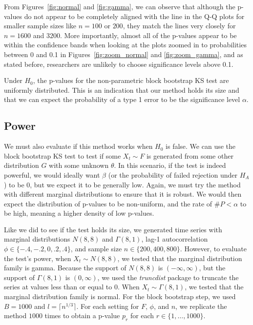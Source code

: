\documentclass[12pt, titlepage, letterpaper]{article}
\begin{document}
{From Figures~\ref{fig:normal} and \ref{fig:gamma}, we can observe that 
although the p-values do not appear to be 
completely aligned with the line
in the Q-Q plots for smaller sample sizes like $n = 100$ or $200$, they match
the lines very closely for $n = 1600$ and $3200$. More importantly, almost
all of the p-values appear to be within the confidence bands when looking at the
plots zoomed in to probabilities between 0 and 0.1 in 
Figures~\ref{fig:zoom_normal} and \ref{fig:zoom_gamma}, and as stated 
before, 
researchers are unlikely to choose significance levels above 0.1. 


Under $H_0$, the p-values for the non-parametric block bootstrap KS test are
uniformly distributed. This is an indication that our method 
holds its size and that we can expect the probability
of a type 1 error to be the significance level $\alpha$.


\subsection{Power}
We must also evaluate if this method works when $H_0$ is false. We can use
the block bootstrap KS test to test if some $X_t \sim F$ is generated from 
some other 
distribution $G$ with some unknown $\theta$. In this scenario, if the test is 
indeed powerful,
we would ideally want $\beta$ 
(or the probability of failed rejection under $H_A$) 
to be 0, but we
expect it to be generally low. Again, we must try the method with different
marginal distributions to ensure that it is robust.
We would then expect the distribution of p-values to be non-uniform, and the 
rate
of $\#P < \alpha$ to be high, meaning a higher density of low p-values.


Like we did to see if the test holds its size, we generated time series with 
marginal distributions $N(8, 8)$ and 
$\Gamma(8, 1)$, lag-1 autocorrelation $\phi \in \{-.4, -.2, 0, .2, .4\}$, and
sample size $n \in \{200, 400, 800\}$. However, 
to evaluate the test's power, when $X_t \sim N(8, 8)$, we tested that the 
marginal distribution family is gamma. Because the support of $N(8, 8)$ is
$(-\infty, \infty)$, but the support of $\Gamma(8, 1)$ is $(0, \infty)$, we used
the \textsl{truncdist} package \citep{truncdist} to truncate the series at 
values less than or equal to 0.
When $X_t \sim \Gamma(8, 1)$, we tested
that the marginal distribution family is normal. For the block bootstrap step,
we used $B = 1000$ and $l = \lceil n^{1/3} \rceil$.
For each setting for $F$, $\phi$, and $n$, we replicate the method $1000$ times 
to obtain a p-value $p_r$ for each $r \in \{1, \ldots, 1000\}$.


}
\end{document}
